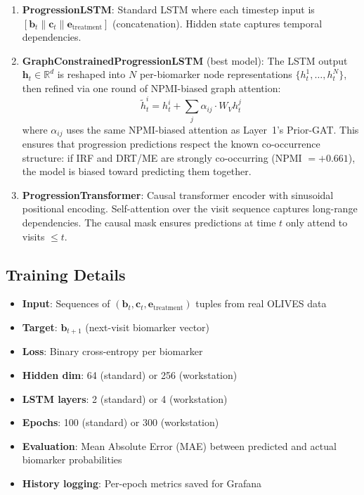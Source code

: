 \documentclass[12pt,a4paper]{article}
\begin{document}
\begin{enumerate}[nosep]
  \item \textbf{ProgressionLSTM}: Standard LSTM where each timestep input is $[\mathbf{b}_t \| \mathbf{c}_t \| \mathbf{e}_{\text{treatment}}]$ (concatenation). Hidden state captures temporal dependencies.

  \item \textbf{GraphConstrainedProgressionLSTM} (best model): The LSTM output $\mathbf{h}_t \in \mathbb{R}^d$ is reshaped into $N$ per-biomarker node representations $\{h_t^1, \ldots, h_t^N\}$, then refined via one round of NPMI-biased graph attention:
  \begin{equation}
    \tilde{h}_t^i = h_t^i + \sum_{j} \alpha_{ij} \cdot W_V h_t^j
  \end{equation}
  where $\alpha_{ij}$ uses the same NPMI-biased attention as Layer~1's Prior-GAT. This ensures that progression predictions respect the known co-occurrence structure: if IRF and DRT/ME are strongly co-occurring (NPMI $= +0.661$), the model is biased toward predicting them together.

  \item \textbf{ProgressionTransformer}: Causal transformer encoder with sinusoidal positional encoding. Self-attention over the visit sequence captures long-range dependencies. The causal mask ensures predictions at time $t$ only attend to visits $\leq t$.
\end{enumerate}

\subsection{Training Details}

\begin{itemize}[nosep]
  \item \textbf{Input}: Sequences of $(\mathbf{b}_t, \mathbf{c}_t, \mathbf{e}_{\text{treatment}})$ tuples from real OLIVES data
  \item \textbf{Target}: $\mathbf{b}_{t+1}$ (next-visit biomarker vector)
  \item \textbf{Loss}: Binary cross-entropy per biomarker
  \item \textbf{Hidden dim}: 64 (standard) or 256 (workstation)
  \item \textbf{LSTM layers}: 2 (standard) or 4 (workstation)
  \item \textbf{Epochs}: 100 (standard) or 300 (workstation)
  \item \textbf{Evaluation}: Mean Absolute Error (MAE) between predicted and actual biomarker probabilities
  \item \textbf{History logging}: Per-epoch metrics saved for Grafana
\end{itemize}
\end{document}
